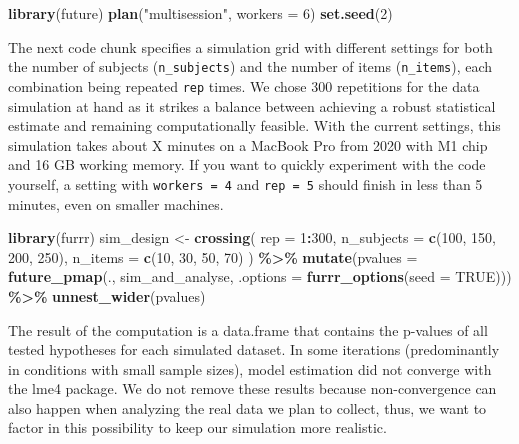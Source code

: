 \documentclass[
  man,floatsintext]{apa6}
\newenvironment{Shaded}{\begin{snugshade}}{\end{snugshade}}
\newcommand{\AttributeTok}[1]{\textcolor[rgb]{0.13,0.29,0.53}{#1}}
\newcommand{\ConstantTok}[1]{\textcolor[rgb]{0.56,0.35,0.01}{#1}}
\newcommand{\DecValTok}[1]{\textcolor[rgb]{0.00,0.00,0.81}{#1}}
\newcommand{\FunctionTok}[1]{\textcolor[rgb]{0.13,0.29,0.53}{\textbf{#1}}}
\newcommand{\NormalTok}[1]{#1}
\newcommand{\OtherTok}[1]{\textcolor[rgb]{0.56,0.35,0.01}{#1}}
\newcommand{\SpecialCharTok}[1]{\textcolor[rgb]{0.81,0.36,0.00}{\textbf{#1}}}
\newcommand{\StringTok}[1]{\textcolor[rgb]{0.31,0.60,0.02}{#1}}
\begin{document}
\begin{Shaded}
\begin{Highlighting}[]
\FunctionTok{library}\NormalTok{(future)}
\FunctionTok{plan}\NormalTok{(}\StringTok{"multisession"}\NormalTok{, }\AttributeTok{workers =} \DecValTok{6}\NormalTok{)}
\FunctionTok{set.seed}\NormalTok{(}\DecValTok{2}\NormalTok{)}
\end{Highlighting}
\end{Shaded}

The next code chunk specifies a simulation grid with different settings for both the number of subjects (\texttt{n\_subjects}) and the number of items (\texttt{n\_items}), each combination being repeated \texttt{rep} times. We chose 300 repetitions for the data simulation at hand as it strikes a balance between achieving a robust statistical estimate and remaining computationally feasible.
With the current settings, this simulation takes about X minutes on a MacBook Pro from 2020 with M1 chip and 16 GB working memory. If you want to quickly experiment with the code yourself, a setting with \texttt{workers\ =\ 4} and \texttt{rep\ =\ 5} should finish in less than 5 minutes, even on smaller machines.

\begin{Shaded}
\begin{Highlighting}[]
\FunctionTok{library}\NormalTok{(furrr)}
\NormalTok{sim\_design }\OtherTok{\textless{}{-}} \FunctionTok{crossing}\NormalTok{(}
  \AttributeTok{rep =} \DecValTok{1}\SpecialCharTok{:}\DecValTok{300}\NormalTok{,}
  \AttributeTok{n\_subjects =} \FunctionTok{c}\NormalTok{(}\DecValTok{100}\NormalTok{, }\DecValTok{150}\NormalTok{, }\DecValTok{200}\NormalTok{, }\DecValTok{250}\NormalTok{),}
  \AttributeTok{n\_items =} \FunctionTok{c}\NormalTok{(}\DecValTok{10}\NormalTok{, }\DecValTok{30}\NormalTok{, }\DecValTok{50}\NormalTok{, }\DecValTok{70}\NormalTok{)}
\NormalTok{) }\SpecialCharTok{\%\textgreater{}\%}
  \FunctionTok{mutate}\NormalTok{(}\AttributeTok{pvalues =} \FunctionTok{future\_pmap}\NormalTok{(., sim\_and\_analyse, }
    \AttributeTok{.options =} \FunctionTok{furrr\_options}\NormalTok{(}\AttributeTok{seed =} \ConstantTok{TRUE}\NormalTok{))) }\SpecialCharTok{\%\textgreater{}\%}
  \FunctionTok{unnest\_wider}\NormalTok{(pvalues)}
\end{Highlighting}
\end{Shaded}

The result of the computation is a data.frame that contains the p-values of all tested hypotheses for each simulated dataset.
In some iterations (predominantly in conditions with small sample sizes), model estimation did not converge with the lme4 package. We do not remove these results because non-convergence can also happen when analyzing the real data we plan to collect, thus, we want to factor in this possibility to keep our simulation more realistic.
\end{document}
